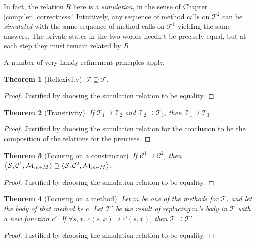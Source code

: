 \documentclass{amsbook}
\newtheorem{theorem}{Theorem}[chapter]
\theoremstyle{definition}
\theoremstyle{remark}
\numberwithin{section}{chapter}
\numberwithin{equation}{chapter}
\begin{document}
In fact, the relation $R$ here is a \emph{simulation}, in the sense of Chapter \ref{compiler_correctness}!
Intuitively, any sequence of method calls on $\mathcal T^2$ can be \emph{simulated} with the same sequence of method calls on $\mathcal T^1$ yielding the same answers.
The private states in the two worlds needn't be precisely equal, but at each step they must remain related by $R$.

A number of very handy refinement principles apply.

\begin{theorem}[Reflexivity]\label{adtrefl}
  $\mathcal T \supseteq \mathcal T$.
\end{theorem}
\begin{proof}
  Justified by choosing the simulation relation to be equality.
\end{proof}

\begin{theorem}[Transitivity]
  If $\mathcal T_1 \supseteq \mathcal T_2$ and $\mathcal T_2 \supseteq \mathcal T_3$, then $\mathcal T_1 \supseteq \mathcal T_3$.
\end{theorem}
\begin{proof}
  Justified by choosing the simulation relation for the conclusion to be the composition of the relations for the premises.
\end{proof}

\begin{theorem}[Focusing on a constructor]
  If $\mathcal C^1 \supseteq \mathcal C^2$, then ${\left \langle \mathcal S, \mathcal C^1, \mathcal M_{m \in M} \right \rangle} \supseteq {\left \langle \mathcal S, \mathcal C^2, \mathcal M_{m \in M} \right \rangle}$.
\end{theorem}
\begin{proof}
  Justified by choosing the simulation relation to be equality.
\end{proof}

\begin{theorem}[Focusing on a method]\label{refinemethod}
  Let $m$ be one of the methods for $\mathcal T$, and let the body of that method be $c$.
  Let $\mathcal T'$ be the result of replacing $m$'s body in $\mathcal T$ with a new function $c'$.
  If $\forall s, x. \; c(s, x) \supseteq c'(s, x)$, then $\mathcal T \supseteq \mathcal T'$.
\end{theorem}
\begin{proof}
  Justified by choosing the simulation relation to be equality.
\end{proof}
\end{document}
